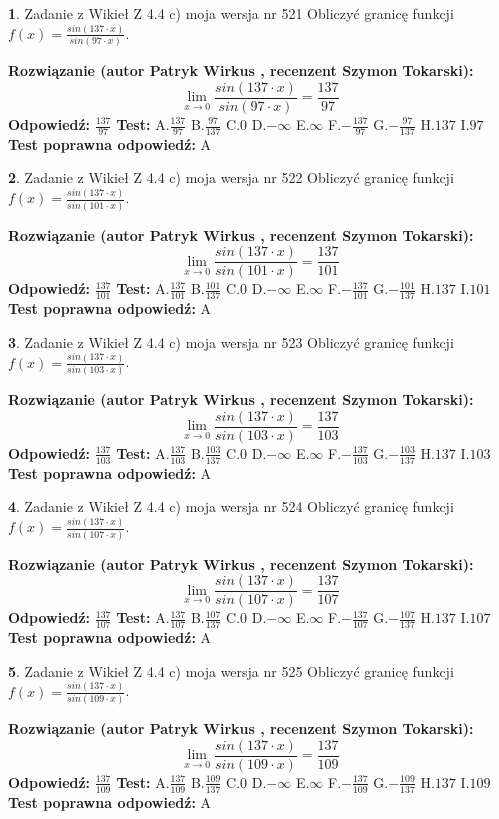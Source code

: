 \documentclass[12pt, a4paper]{article}
\theoremstyle{definition} %
\newtheorem{zad}{}
\newcommand{\zadStart}[1]{\begin{zad}#1\newline}
\newcommand{\zadStop}{\end{zad}}
\newcommand{\rozwStart}[2]{\noindent \textbf{Rozwiązanie (autor #1 , recenzent #2): }\newline}
\newcommand{\rozwStop}{\newline}
\newcommand{\odpStart}{\noindent \textbf{Odpowiedź:}\newline}
\newcommand{\odpStop}{\newline}
\newcommand{\testStart}{\noindent \textbf{Test:}\newline}
\newcommand{\testStop}{\newline}
\newcommand{\kluczStart}{\noindent \textbf{Test poprawna odpowiedź:}\newline}
\newcommand{\kluczStop}{\newline}
\begin{document}
\zadStart{Zadanie z Wikieł Z 4.4 c) moja wersja nr 521}
Obliczyć granicę funkcji $f(x)=\frac{sin(137\cdot x)}{sin(97\cdot x)}$.
\zadStop
\rozwStart{Patryk Wirkus}{Szymon Tokarski}
$$\lim\limits_{x\to 0}\frac{sin(137\cdot x)}{sin(97\cdot x)}=
\frac{137}{97}$$
\rozwStop
\odpStart
$\frac{137}{97}$
\odpStop
\testStart
A.$\frac{137}{97}$
B.$\frac{97}{137}$
C.$0$
D.$-\infty$
E.$\infty$
F.$-\frac{137}{97}$
G.$-\frac{97}{137}$
H.$137$
I.$97$
\testStop
\kluczStart
A
\kluczStop



\zadStart{Zadanie z Wikieł Z 4.4 c) moja wersja nr 522}
Obliczyć granicę funkcji $f(x)=\frac{sin(137\cdot x)}{sin(101\cdot x)}$.
\zadStop
\rozwStart{Patryk Wirkus}{Szymon Tokarski}
$$\lim\limits_{x\to 0}\frac{sin(137\cdot x)}{sin(101\cdot x)}=
\frac{137}{101}$$
\rozwStop
\odpStart
$\frac{137}{101}$
\odpStop
\testStart
A.$\frac{137}{101}$
B.$\frac{101}{137}$
C.$0$
D.$-\infty$
E.$\infty$
F.$-\frac{137}{101}$
G.$-\frac{101}{137}$
H.$137$
I.$101$
\testStop
\kluczStart
A
\kluczStop



\zadStart{Zadanie z Wikieł Z 4.4 c) moja wersja nr 523}
Obliczyć granicę funkcji $f(x)=\frac{sin(137\cdot x)}{sin(103\cdot x)}$.
\zadStop
\rozwStart{Patryk Wirkus}{Szymon Tokarski}
$$\lim\limits_{x\to 0}\frac{sin(137\cdot x)}{sin(103\cdot x)}=
\frac{137}{103}$$
\rozwStop
\odpStart
$\frac{137}{103}$
\odpStop
\testStart
A.$\frac{137}{103}$
B.$\frac{103}{137}$
C.$0$
D.$-\infty$
E.$\infty$
F.$-\frac{137}{103}$
G.$-\frac{103}{137}$
H.$137$
I.$103$
\testStop
\kluczStart
A
\kluczStop



\zadStart{Zadanie z Wikieł Z 4.4 c) moja wersja nr 524}
Obliczyć granicę funkcji $f(x)=\frac{sin(137\cdot x)}{sin(107\cdot x)}$.
\zadStop
\rozwStart{Patryk Wirkus}{Szymon Tokarski}
$$\lim\limits_{x\to 0}\frac{sin(137\cdot x)}{sin(107\cdot x)}=
\frac{137}{107}$$
\rozwStop
\odpStart
$\frac{137}{107}$
\odpStop
\testStart
A.$\frac{137}{107}$
B.$\frac{107}{137}$
C.$0$
D.$-\infty$
E.$\infty$
F.$-\frac{137}{107}$
G.$-\frac{107}{137}$
H.$137$
I.$107$
\testStop
\kluczStart
A
\kluczStop



\zadStart{Zadanie z Wikieł Z 4.4 c) moja wersja nr 525}
Obliczyć granicę funkcji $f(x)=\frac{sin(137\cdot x)}{sin(109\cdot x)}$.
\zadStop
\rozwStart{Patryk Wirkus}{Szymon Tokarski}
$$\lim\limits_{x\to 0}\frac{sin(137\cdot x)}{sin(109\cdot x)}=
\frac{137}{109}$$
\rozwStop
\odpStart
$\frac{137}{109}$
\odpStop
\testStart
A.$\frac{137}{109}$
B.$\frac{109}{137}$
C.$0$
D.$-\infty$
E.$\infty$
F.$-\frac{137}{109}$
G.$-\frac{109}{137}$
H.$137$
I.$109$
\testStop
\kluczStart
A
\kluczStop
\end{document}
